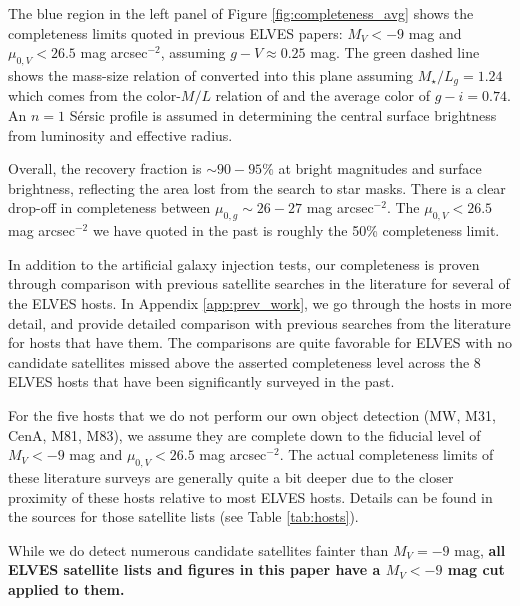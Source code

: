 \documentclass[twocolumn]{aastex62}
\begin{document}
The blue region in the left panel of Figure \ref{fig:completeness_avg} shows the completeness limits quoted in previous ELVES papers: $M_V<-9$ mag and $\mu_{0,V}<26.5$ mag arcsec$^{-2}$, assuming $g-V\approx0.25$ mag. The green dashed line shows the mass-size relation of \citet{carlsten2021a} converted into this plane assuming $M_\star/L_g=1.24$ which comes from the color-$M/L$ relation of \citet{into2013} and the average color of $g-i=0.74$. An $n=1$ S\'{e}rsic profile is assumed in determining the central surface brightness from luminosity and effective radius. 

Overall, the recovery fraction is $\sim90-95\%$ at bright magnitudes and surface brightness, reflecting the area lost from the search to star masks. There is a clear drop-off in completeness between $\mu_{0,g}\sim26-27$ mag arcsec$^{-2}$. The $\mu_{0,V}<26.5$ mag arcsec$^{-2}$ we have quoted in the past is roughly the 50\% completeness limit. 

In addition to the artificial galaxy injection tests, our completeness is proven through comparison with previous satellite searches in the literature for several of the ELVES hosts. In Appendix \ref{app:prev_work}, we go through the hosts in more detail, and provide detailed comparison with previous searches from the literature for hosts that have them. The comparisons are quite favorable for ELVES with no candidate satellites missed above the asserted completeness level across the 8 ELVES hosts that have been significantly surveyed in the past.


For the five hosts that we do not perform our own object detection (MW, M31, CenA, M81, M83), we assume they are complete down to the fiducial level of $M_V<-9$ mag and $\mu_{0,V}<26.5$ mag arcsec$^{-2}$. The actual completeness limits of these literature surveys are generally quite a bit deeper due to the closer proximity of these hosts relative to most ELVES hosts. Details can be found in the sources for those satellite lists (see Table \ref{tab:hosts}).


While we do detect numerous candidate satellites fainter than $M_V=-9$ mag, \textbf{all ELVES satellite lists and figures in this paper have a $M_V<-9$ mag cut applied to them.}
\end{document}
